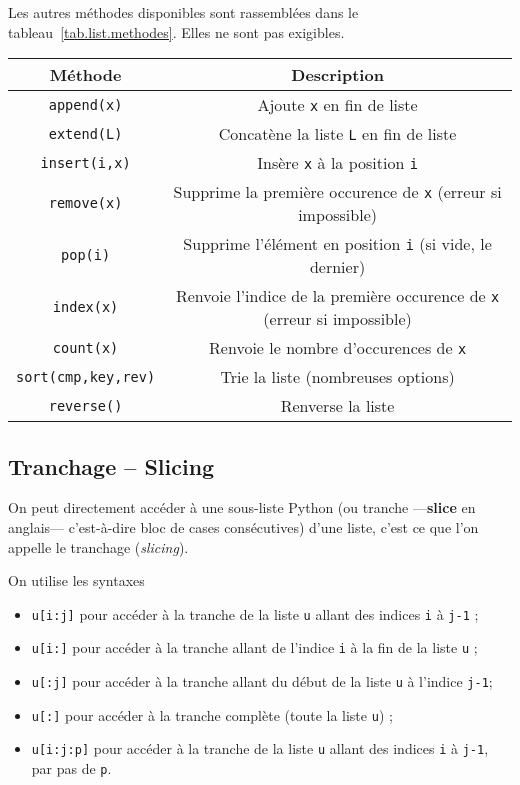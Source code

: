 Les autres méthodes disponibles sont rassemblées dans le tableau~\ref{tab.list.methodes}. Elles ne sont pas exigibles.
  \begin{center}
    \begin{tabular}{|c|c|}
      \hline 
      Méthode & Description \\
      \hline
      \texttt{append(x)} & Ajoute \texttt{x} en fin de liste \\
      \hline
      \texttt{extend(L)} & Concatène la liste \texttt{L} en fin de liste \\
      \hline
      \texttt{insert(i,x)} & Insère  \texttt{x} à la position \texttt{i} \\
      \hline
      \texttt{remove(x)} & Supprime la première occurence de \texttt{x} (erreur si impossible)\\
      \hline
      \texttt{pop(i)} & Supprime l'élément en position \texttt{i} (si vide, le dernier) \\
      \hline 
      \texttt{index(x)} & Renvoie l'indice de la première occurence de \texttt{x} (erreur si impossible)\\
      \hline
      \texttt{count(x)} & Renvoie le nombre d'occurences de \texttt{x} \\
      \hline
      \texttt{sort(cmp,key,rev)} & Trie la liste (nombreuses options) \\
      \hline
      \texttt{reverse()} & Renverse la liste \\
      \hline
    \end{tabular}
  \label{tab.list.methodes}
  \end{center}

%
\subsection{Tranchage -- Slicing}

On peut directement accéder à une sous-liste Python (ou tranche ---\textbf{slice} en anglais--- 
c'est-à-dire bloc de cases consécutives) d'une liste, c'est ce que l'on appelle le tranchage 
(\textit{slicing}).

On utilise les  syntaxes 
\begin{itemize}
  \item \texttt{u[i:j]} pour accéder à la tranche de la liste \texttt{u} allant des indices \texttt{i} à \texttt{j-1} ;
  \item \texttt{u[i:]} pour accéder à la tranche allant de l'indice \texttt{i} à la fin de la liste \texttt{u} ;
  \item \texttt{u[:j]} pour accéder à la tranche allant du début de la liste \texttt{u} à l'indice \texttt{j-1};
  \item \texttt{u[:]} pour accéder à la tranche complète (toute la liste \texttt{u}) ;
  \item \texttt{u[i:j:p]} pour accéder à la tranche de la liste \texttt{u} allant des indices \texttt{i} à \texttt{j-1}, par pas de \texttt{p}.
\end{itemize}

